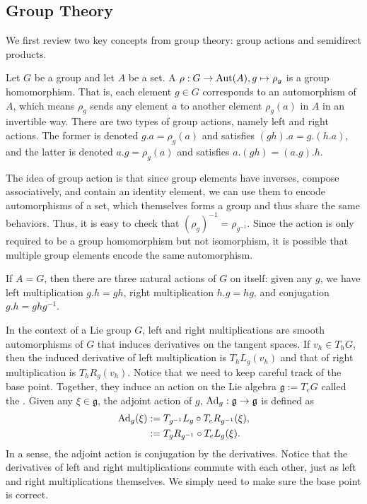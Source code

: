 \documentclass[12pt,class=article,crop=false]{standalone}
\begin{document}
\subsection{Group Theory}
We first review two key concepts from group theory: group actions and semidirect products.
\begin{defn}
	Let $ G$ be a group and let  $ A$ be a set. A  $ \rho: G \to \operatorname{Aut} (A), g \mapsto \rho_g$ is a group homomorphism. That is, each element $ g \in G$ corresponds to an automorphism of $ A$, which means $ \rho_g$ sends any element $ a$ to another element $ \rho_g(a)$ in $ A$ in an invertible way. There are two types of group actions, namely left and right actions. The former is denoted $ g.a = \rho_g(a)$ and satisfies $ (gh).a = g.(h.a)$, and the latter is denoted $ a .g = \rho_g(a)$ and satisfies $ a.(gh) = (a .g).h$.
\end{defn}
The idea of group action is that since group elements have inverses, compose associatively, and contain an identity element, we can use them to encode automorphisms of a set, which themselves forms a group and thus share the same behaviors. Thus, it is easy to check that $ (\rho_g)^{-1} = \rho_{g^{-1}}$. Since the action is only required to be a group homomorphism but not isomorphism, it is possible that multiple group elements encode the same automorphism.

If $ A = G$, then there are three natural actions of  $ G$ on itself: given any $ g$, we have left multiplication $ g.h = gh$, right multiplication $ h.g = hg$, and conjugation $ g.h = ghg^{-1}$.

In the context of a Lie group $ G$, left and right multiplications are smooth automorphisms of $ G$ that induces derivatives on the tangent spaces. If $ v_h \in T_hG $, then the induced derivative of left multiplication is $T_h L_g (v_h) $ and that of right multiplication is $ T_hR_g(v_h)$. Notice that we need to keep careful track of the base point. Together, they induce an action on the Lie algebra $ \mathfrak{g} := T_e G $ called the . Given any $ \xi \in \mathfrak{g} $, the adjoint action of $ g$, $ \operatorname{Ad}_{ g}: \mathfrak{g} \to \mathfrak{g} $ is defined as 
\begin{align*}
	\operatorname{Ad}_{ g}( \xi) &:= T_{g^{-1}} L_{g} \circ  T_e R_{g^{-1}} (\xi), \\
	&:= T_g R_{g^{-1}} \circ  T_e L_g (\xi) .
\end{align*}
In a sense, the adjoint action is conjugation by the derivatives. Notice that the derivatives of left and right multiplications commute with each other, just as left and right multiplications themselves. We simply need to make sure the base point is correct.
\end{document}
